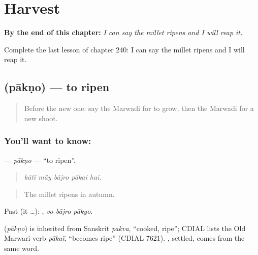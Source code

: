
\chapter{Harvest}
\label{ch:mw-harvest}

\begin{chapteropening}
\textbf{By the end of this chapter:} \emph{I can say the millet ripens and I will reap it.}

Complete the last lesson of chapter 240: I can say the millet ripens and I will reap it.
\end{chapteropening}

\section[\texorpdfstring{\mw{पाकणो} (pākṇo)}{पाकणो (pākṇo)}]{ (pākṇo) — to ripen}

\label{lesson:MW-C240-pakno}



\begin{quote}
Before the new one: say the Marwadi for to grow, then the Marwadi for a new shoot.
\end{quote}

\subsection*{You'll want to know: }
\textbf{} — \emph{pākṇo} — \textquotedblleft{}to ripen\textquotedblright{}.

\begin{quote}
    
\end{quote}

\begin{quote}
\emph{kātī mā̃y bājro pākai hai.}
\end{quote}

\begin{quote}
The millet ripens in autumn.
\end{quote}

Past (it …):   , \emph{vo bājro pākyo}.

\begin{cousinweb}
\textbf{} (\emph{pākṇo}) is inherited from Sanskrit \emph{pakva}, \textquotedblleft{}cooked, ripe\textquotedblright{}; CDIAL lists the Old Marwari verb \emph{pākaï}, \textquotedblleft{}becomes ripe\textquotedblright{} (CDIAL 7621). \textbf{}, settled, comes from the same word.
\end{cousinweb}

